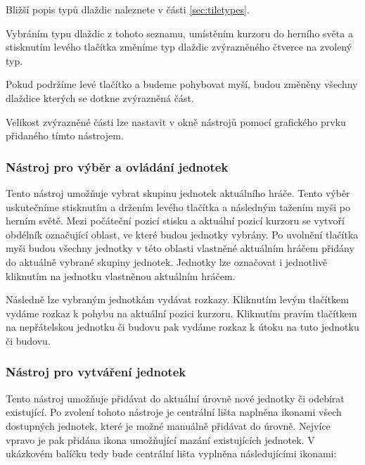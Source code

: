 \bigskip

Bližší popis typů dlaždic naleznete v části \ref{sec:tiletypes}.

Vybráním typu dlaždic z tohoto seznamu, umístěním kurzoru do herního světa a stisknutím levého tlačítka změníme typ dlaždic zvýrazněného čtverce na zvolený typ.

Pokud podržíme levé tlačítko a budeme pohybovat myší, budou změněny všechny dlaždice kterých se dotkne zvýrazněná část.

Velikost zvýrazněné části lze nastavit v okně nástrojů pomocí grafického prvku přidaného tímto nástrojem.

\subsubsection{Nástroj pro výběr a ovládání jednotek}
Tento nástroj umožňuje vybrat skupinu jednotek aktuálního hráče. Tento výběr uskutečníme stisknutím a držením levého tlačítka a následným tažením myši po herním světě. Mezi počáteční pozicí stisku a aktuální pozicí kurzoru se vytvoří obdélník označující oblast, ve které budou jednotky vybrány. Po uvolnění tlačítka myši budou všechny jednotky v této oblasti vlastněné aktuálním hráčem přidány do aktuálně vybrané skupiny jednotek. Jednotky lze označovat i jednotlivě kliknutím na jednotku vlastněnou aktuálním hráčem.

Následně lze vybraným jednotkám vydávat rozkazy. Kliknutím levým tlačítkem vydáme rozkaz k pohybu na aktuální pozici kurzoru. Kliknutím pravím tlačítkem na nepřátelskou jednotku či budovu pak vydáme rozkaz k útoku na tuto jednotku či budovu.

\subsubsection{Nástroj pro vytváření jednotek}
Tento nástroj umožňuje přidávat do aktuální úrovně nové jednotky či odebírat existující. Po zvolení tohoto nástroje je centrální lišta naplněna ikonami všech dostupných jednotek, které je možné manuálně přidávat do úrovně. Nejvíce vpravo je pak přidána ikona umožňující mazání existujících jednotek. V ukázkovém balíčku tedy bude centrální lišta vyplněna následujícími ikonami:

\medskip
{}

